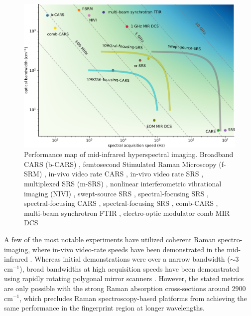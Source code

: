 \documentclass{optica-article}
\begin{document}
\begin{figure}[h]
    \centering
    \includegraphics[width=\linewidth]{bckgnd_with_cm.png}
    \caption{Performance map of mid-infrared hyperspectral imaging. Broadband CARS (b-CARS) \cite{keeSimpleApproachOnelaser2004}, femtosecond Stimulated Raman Microscopy (f-SRM) \cite{ploetzFemtosecondStimulatedRaman2007}, in-vivo video rate CARS \cite{evansChemicalImagingTissue2005}, in-vivo video rate SRS \cite{saarVideoRateMolecularImaging2010}, multiplexed SRS (m-SRS) \cite{fuQuantitativeChemicalImaging2012,liaoMicrosecondScaleVibrational2015}, nonlinear interferometric vibrational imaging (NIVI) \cite{chowdaryMolecularHistopathologySpectrally2010}, swept-source SRS \cite{ozekiHighspeedMolecularSpectral2012}, spectral-focusing SRS \cite{fuHyperspectralImagingStimulated2013}, spectral-focusing CARS \cite{dinapoliHyperspectralDifferentialCARS2014}, spectral-focusing SRS \cite{linMicrosecondFingerprintStimulated2021}, comb-CARS \cite{ideguchiCoherentRamanSpectroimaging2013}, multi-beam synchrotron FTIR \cite{nasseHighresolutionFouriertransformInfrared2011}, electro-optic modulator comb MIR DCS \cite{ullahkhanDirectHyperspectralDualcomb2020}}
    \label{fig:bckgnd}
\end{figure}

A few of the most notable experiments have utilized coherent Raman spectro-imaging, where in-vivo video-rate speeds have been demonstrated in the mid-infrared \cite{evansChemicalImagingTissue2005, saarVideoRateMolecularImaging2010}. Whereas initial demonstrations were over a narrow bandwidth (\mbox{$\sim$3 $\mathrm{cm^{-1}}$}), broad bandwidths at high acquisition speeds have been demonstrated using rapidly rotating polygonal mirror scanners \cite{tamamitsuUltrafastBroadbandFouriertransform2017, linMicrosecondFingerprintStimulated2021}. However, the stated metrics are only possible with the strong Raman absorption cross-sections around \mbox{2900 $\mathrm{cm^{-1}}$}, which precludes Raman spectroscopy-based platforms from achieving the same performance in the fingerprint region at longer wavelengths.
\end{document}
